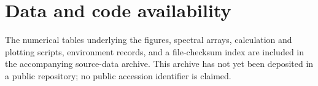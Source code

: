 \documentclass[
  aps,
  prb,
  reprint,
  amsmath,
  amssymb,
  superscriptaddress,
  longbibliography,
  nofootinbib,
  floatfix
]{revtex4-2}
\begin{document}
\section*{Data and code availability}
The numerical tables underlying the figures, spectral arrays, calculation
and plotting scripts, environment records, and a file-checksum index are
included in the accompanying source-data archive. This archive has not yet
been deposited in a public repository; no public accession identifier is
claimed.

\appendix


\clearpage

\setlength{\bibsep}{2.0pt plus 0.3ex}

\end{document}
